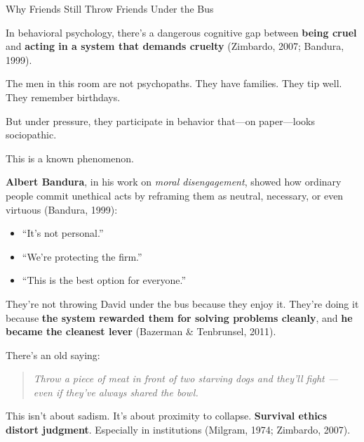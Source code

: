 \begin{PsychologicalSidebar}{Why Friends Still Throw Friends Under the Bus}

    In behavioral psychology, there's a dangerous cognitive gap between \textbf{being cruel}
    and \textbf{acting in a system that demands cruelty} (Zimbardo, 2007; Bandura, 1999).

    \medskip

    The men in this room are not psychopaths.  
    They have families. They tip well. They remember birthdays.

    \medskip

    But under pressure, they participate in behavior that—on paper—looks sociopathic.

    \medskip

    This is a known phenomenon.

    \medskip

    \textbf{Albert Bandura}, in his work on \textit{moral disengagement}, showed how ordinary 
    people commit unethical acts by reframing them as neutral, necessary, or even virtuous 
    (Bandura, 1999):

    \begin{itemize}
        \item ``It’s not personal.''
        \item ``We’re protecting the firm.''
        \item ``This is the best option for everyone.''
    \end{itemize}

    \medskip

    They’re not throwing David under the bus because they enjoy it.  
    They’re doing it because \textbf{the system rewarded them for solving problems cleanly}, 
    and \textbf{he became the cleanest lever} (Bazerman \& Tenbrunsel, 2011).

    \medskip

    There’s an old saying:

    \medskip

    \begin{quote}
        \textit{Throw a piece of meat in front of two starving dogs and they’ll fight --- 
        even if they’ve always shared the bowl.}
    \end{quote}

    \medskip

    This isn’t about sadism.  
    It’s about proximity to collapse.  
    \textbf{Survival ethics distort judgment}.  
    Especially in institutions (Milgram, 1974; Zimbardo, 2007).


\end{PsychologicalSidebar}
